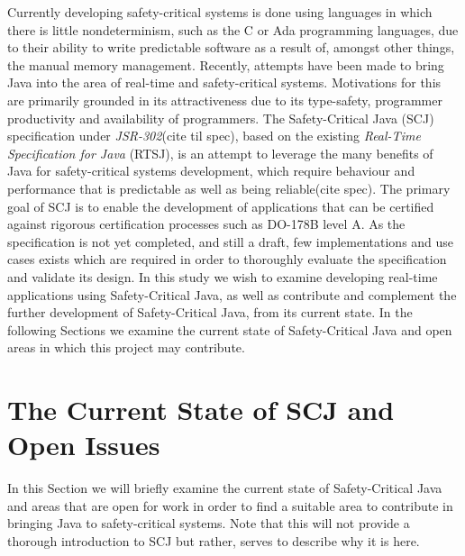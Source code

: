 Currently developing safety-critical systems is done using languages in which there is little nondeterminism, such as the C or Ada programming languages, due to their ability to write predictable software as a result of, amongst other things, the manual memory management. Recently, attempts have been made to bring Java into the area of real-time and safety-critical systems. Motivations for this are primarily grounded in its attractiveness due to its type-safety, programmer productivity and availability of programmers.
The Safety-Critical Java (SCJ) specification under \textit{JSR-302}\cite{JSR}(cite til spec), based on the existing \textit{Real-Time Specification for Java} (RTSJ), is an attempt to leverage the many benefits of Java for safety-critical systems development, which require behaviour and performance that is predictable as well as being reliable(cite spec). The primary goal of SCJ is to enable the development of applications that can be certified against rigorous certification processes such as DO-178B level A. As the specification is not yet completed, and still a draft, few implementations and use cases exists which are required in order to thoroughly evaluate the specification and validate its design.
In this study we wish to examine developing real-time applications using Safety-Critical Java, as well as contribute and complement the further development of Safety-Critical Java, from its current state. In the following Sections we examine the current state of Safety-Critical Java and open areas in which this project may contribute.

\section{The Current State of SCJ and Open Issues}
In this Section we will briefly examine the current state of Safety-Critical Java and areas that are open for work in order to find a suitable area to contribute in bringing Java to safety-critical systems. Note that this will not provide a thorough introduction to SCJ but rather, serves to describe why it is here.

